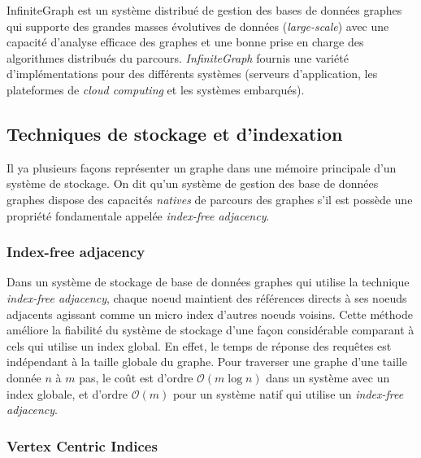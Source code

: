     \textsf{InfiniteGraph} \cite{infinitegraph} est un système
    distribué de gestion des bases de données graphes qui supporte des
    grandes masses évolutives de données (\emph{large-scale}) avec une
    capacité d'analyse efficace des graphes et une bonne prise en
    charge des algorithmes distribués du
    parcours. \emph{InfiniteGraph} fournis une variété
    d'implémentations pour des différents systèmes (serveurs
    d'application, les plateformes de \emph{cloud computing} et les
    systèmes embarqués).

  \subsection{Techniques de stockage et d'indexation}
  \label{sec:graph-internals}
  Il ya plusieurs façons représenter un graphe dans une mémoire
  principale d'un système de stockage. On dit qu'un système de gestion
  des base de données graphes dispose des capacités \emph{natives} de
  parcours des graphes s'il est possède une propriété fondamentale
  appelée \emph{index-free adjacency}.

  
  \newpage

    \subsubsection{Index-free adjacency}
    \label{sec:index-free}
    Dans un système de stockage de base de données graphes qui utilise
    la technique \emph{index-free adjacency}, chaque noeud maintient
    des références directs à ses noeuds adjacents agissant comme un
    micro index d'autres noeuds voisins. Cette méthode améliore la
    fiabilité du système de stockage d'une façon considérable
    comparant à cels qui utilise un index global. En effet, le temps
    de réponse des requêtes est indépendant à la taille globale du
    graphe. Pour traverser une graphe d'une taille donnée $n$ à $m$
    pas, le coût est d'ordre $\mathcal{O}(m\log{}n)$ dans un système
    avec un index globale, et d'ordre $\mathcal{O}(m)$ pour un système
    natif qui utilise un \emph{index-free adjacency}.

    

    \subsubsection{Vertex Centric Indices}
    \label{sec:vertex}        %

